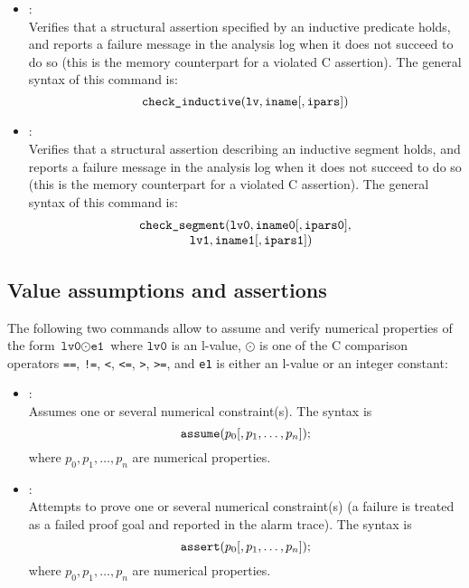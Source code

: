 \begin{itemize}
\item[\dcommand{check\_inductive}]: \\
  Verifies that a structural assertion specified by an inductive predicate
  holds, and reports a failure message in the analysis log when it does
  not succeed to do so (this is the memory counterpart for a violated C
  assertion).
  The general syntax of this command is:
  \[
  \texttt{check\_inductive}( \texttt{lv}, \texttt{iname} [, \texttt{ipars}] )
  \]
\item[\dcommand{check\_segment}]: \\
  Verifies that a structural assertion describing an inductive segment
  holds, and reports a failure message in the analysis log when it does
  not succeed to do so (this is the memory counterpart for a violated C
  assertion).
  The general syntax of this command is:
  \[
  \begin{array}{l}
    \texttt{check\_segment}( \texttt{lv0}, \texttt{iname0}
    [, \texttt{ipars0}], \\
    \qquad \qquad \texttt{lv1}, \texttt{iname1} [, \texttt{ipars1}] )
  \end{array}
  \]
\end{itemize}

\subsection{Value assumptions and assertions}
The following two commands allow to assume and verify numerical
properties of the form \( \texttt{lv0} \mathrel{\odot} \texttt{e1} \)
where \( \texttt{lv0} \) is an l-value, \( \odot \) is one of the C
comparison operators \texttt{==}, \texttt{!=}, \texttt{<}, \texttt{<=},
\texttt{>}, \texttt{>=}, and \texttt{e1} is either an l-value or an
integer constant:
\begin{itemize}
\item[\dcommand{assume}]: \\
  Assumes one or several numerical constraint(s).
  The syntax is
  \[
  \texttt{assume}( p_0 [, p_1, \ldots, p_n ] );
  \]
  where \( p_0, p_1, \ldots, p_n \) are numerical properties.
\item[\dcommand{assert}]: \\
  Attempts to prove one or several numerical constraint(s)
  (a failure is treated as a failed proof goal and reported in the
  alarm trace).
  The syntax is
  \[
  \texttt{assert}( p_0 [, p_1, \ldots, p_n ] );
  \]
  where \( p_0, p_1, \ldots, p_n \) are numerical properties.
\end{itemize}

